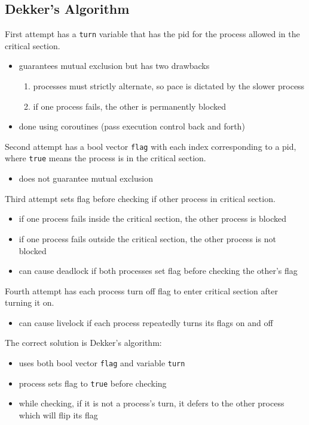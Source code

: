 \documentclass[11pt]{article}
\begin{document}
\subsection{Dekker's Algorithm}
\label{sec:org7a214c1}
First attempt has a \texttt{turn} variable that has the pid for the
process allowed in the critical section.
\begin{itemize}
\item guarantees mutual exclusion but has two drawbacks
\begin{enumerate}
\item processes must strictly alternate, so pace is dictated by
the slower process
\item if one process fails, the other is permanently blocked
\end{enumerate}
\item done using coroutines (pass execution control back and
forth)
\end{itemize}

Second attempt has a bool vector \texttt{flag} with each index
corresponding to a pid, where \texttt{true} means the process is in
the critical section.
\begin{itemize}
\item does not guarantee mutual exclusion
\end{itemize}

Third attempt sets flag before checking if other process
in critical section.
\begin{itemize}
\item if one process fails inside the critical section,
the other process is blocked
\item if one process fails outside the critical section,
the other process is not blocked
\item can cause deadlock if both processes set flag
before checking the other's flag
\end{itemize}

Fourth attempt has each process turn off flag to enter
critical section after turning it on.
\begin{itemize}
\item can cause livelock if each process repeatedly turns
its flags on and off
\end{itemize}

The correct solution is Dekker's algorithm:
\begin{itemize}
\item uses both bool vector \texttt{flag} and variable \texttt{turn}
\item process sets flag to \texttt{true} before checking
\item while checking, if it is not a process's turn,
it defers to the other process which will flip
its flag
\end{itemize}
\end{document}
